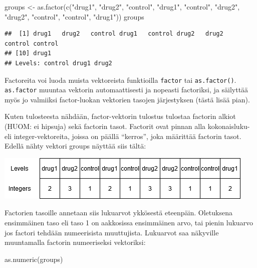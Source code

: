 \documentclass[
]{book}
\newenvironment{Shaded}{\begin{snugshade}}{\end{snugshade}}
\newcommand{\FunctionTok}[1]{\textcolor[rgb]{0.00,0.00,0.00}{#1}}
\newcommand{\NormalTok}[1]{#1}
\newcommand{\OtherTok}[1]{\textcolor[rgb]{0.56,0.35,0.01}{#1}}
\newcommand{\StringTok}[1]{\textcolor[rgb]{0.31,0.60,0.02}{#1}}
\begin{document}
\begin{Shaded}
\begin{Highlighting}[]
\NormalTok{groups }\OtherTok{\textless{}{-}} \FunctionTok{as.factor}\NormalTok{(}\FunctionTok{c}\NormalTok{(}\StringTok{"drug1"}\NormalTok{, }\StringTok{"drug2"}\NormalTok{, }\StringTok{"control"}\NormalTok{, }\StringTok{"drug1"}\NormalTok{, }\StringTok{"control"}\NormalTok{,}
                      \StringTok{"drug2"}\NormalTok{, }\StringTok{"drug2"}\NormalTok{, }\StringTok{"control"}\NormalTok{, }\StringTok{"control"}\NormalTok{, }\StringTok{"drug1"}\NormalTok{))}
\NormalTok{groups}
\end{Highlighting}
\end{Shaded}

\begin{verbatim}
##  [1] drug1   drug2   control drug1   control drug2   drug2   control control
## [10] drug1  
## Levels: control drug1 drug2
\end{verbatim}

Factoreita voi luoda muista vektoreista funktioilla \texttt{factor} tai \texttt{as.factor()}. \texttt{as.factor} muuntaa vektorin automaattisesti ja nopeasti factoriksi, ja säilyttää myös jo valmiiksi factor-luokan vektorien tasojen järjestyksen (tästä lisää pian).

Kuten tulosteesta nähdään, factor-vektorin tulostus tulostaa factorin alkiot (HUOM: ei hipsuja) sekä factorin tasot. Factorit ovat pinnan alla kokonaisluku- eli integer-vektoreita, joissa on päällä ``kerros'', joka määrittää factorin tasot. Edellä nähty vektori groups näyttää siis tältä:

\includegraphics{files/05-statistics/factor.png}

Factorien tasoille annetaan siis lukuarvot ykkösestä eteenpäin. Oletuksena ensimmäinen taso eli taso 1 on aakkosissa ensimmäinen arvo, tai pienin lukuarvo jos factori tehdään numeerisista muuttujista. Lukuarvot saa näkyville muuntamalla factorin numeeriseksi vektoriksi:

\begin{Shaded}
\begin{Highlighting}[]
\FunctionTok{as.numeric}\NormalTok{(groups)}
\end{Highlighting}
\end{Shaded}
\end{document}

